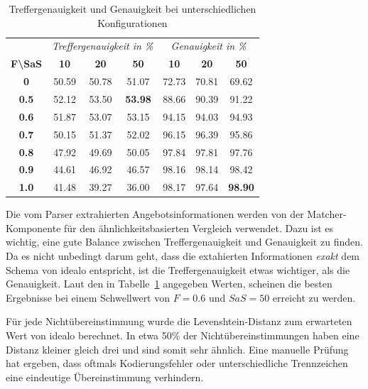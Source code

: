 \begin{table}[h]
    \centering
    \begin{tabular}{ c | c c c | c c c }
        &   \multicolumn{3}{c}{\textit{Treffergenauigkeit in \%}}    &   \multicolumn{3}{c}{\textit{Genauigkeit in \%}} \\
        \textbf{F\textbackslash SaS} & \textbf{10} & \textbf{20} & \textbf{50} & \textbf{10} & \textbf{20} & \textbf{50}  \\
        \hline
        \textbf{0}       &   50.59 &   50.78 &   51.07         &   72.73 &   70.81 &   69.62 \\
        \textbf{0.5}     &   52.12 &   53.50 &   \textbf{53.98}&   88.66 &   90.39 &   91.22 \\
        \textbf{0.6}     &   51.87 &   53.07 &   53.15         &   94.15 &   94.03 &   94.93 \\
        \textbf{0.7}     &   50.15 &   51.37 &   52.02         &   96.15 &   96.39 &   95.86 \\
        \textbf{0.8}     &   47.92 &   49.69 &   50.05         &   97.84 &   97.81 &   97.76 \\
        \textbf{0.9}     &   44.61 &   46.92 &   46.57         &   98.16 &   98.14 &   98.42 \\
        \textbf{1.0}     &   41.48 &   39.27 &   36.00         &   98.17 &   97.64 &   \textbf{98.90}

    \end{tabular}
    \caption{Treffergenauigkeit und Genauigkeit bei unterschiedlichen Konfigurationen}
    \label{tab:accuracy-precision}
\end{table}

Die vom Parser extrahierten Angebotsinformationen werden von der Matcher-Komponente für den ähnlichkeitsbasierten
Vergleich verwendet.
Dazu ist es wichtig, eine gute Balance zwischen Treffergenauigkeit und Genauigkeit zu finden.
Da es nicht unbedingt darum geht, dass die extahierten Informationen \textit{exakt} dem Schema von idealo entspricht,
ist die Treffergenauigkeit etwas wichtiger, als die Genauigkeit.
Laut den in Tabelle~\ref{tab:accuracy-precision} angegeben Werten, scheinen die besten Ergebnisse bei einem
Schwellwert von $F=0.6$ und $SaS=50$ erreicht zu werden.

Für jede Nichtübereinstimmung wurde die Levenshtein-Distanz zum erwarteten Wert von idealo berechnet.
In etwa 50\% der Nichtübereinstimmungen haben eine Distanz kleiner gleich drei und sind somit sehr ähnlich.
Eine manuelle Prüfung hat ergeben, dass oftmals Kodierungsfehler oder unterschiedliche Trennzeichen eine eindeutige
Übereinstimmung verhindern.


